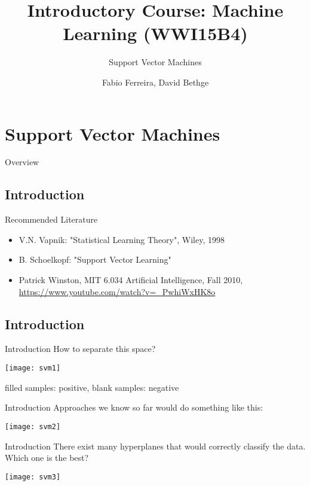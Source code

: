 \documentclass{beamer}
\title[]{Introductory Course: Machine Learning (WWI15B4)}
\subtitle{Support Vector Machines}
\author{Fabio Ferreira, David Bethge}
\institute{DHBW Karlsruhe}
\date{}
\begin{document}
%
%

\begin{frame}
  \titlepage
\end{frame}



\section{Support Vector Machines}
\begin{frame}{Overview}
\tableofcontents
\end{frame}

\subsection{Introduction}
\begin{frame}{Recommended Literature}
\begin{itemize}
\item V.N. Vapnik: "Statistical Learning Theory", Wiley, 1998
\item B. Schoelkopf: "Support Vector Learning"
\item Patrick Winston, MIT 6.034 Artificial Intelligence, Fall 2010, \url{https://www.youtube.com/watch?v=_PwhiWxHK8o}
\end{itemize}
\end{frame}


\subsection{Introduction}
\begin{frame}{Introduction}
How to separate this space?
\begin{center}
\texttt{[image: svm1]}
\end{center}
filled samples: positive, blank samples: negative
\end{frame}

\begin{frame}{Introduction}
Approaches we know so far would do something like this:
\begin{center}
\texttt{[image: svm2]}
\end{center}
\end{frame}

\begin{frame}{Introduction}
There exist many hyperplanes that would correctly classify the data. Which one is the best?
\begin{center}
\texttt{[image: svm3]}
\end{center}
\end{frame}
\end{document}
